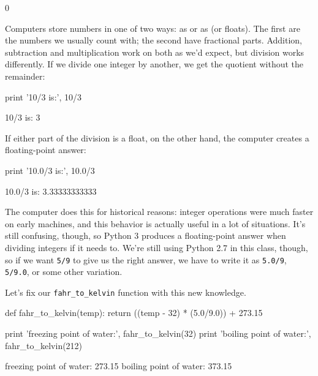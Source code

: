 \documentclass{book}
\begin{document}
\begin{VerbOut}
0
\end{VerbOut}

Computers store numbers in one of two ways: as
 or as  (or floats). The first are the numbers we usually count with;
the second have fractional parts. Addition, subtraction and
multiplication work on both as we'd expect, but division works
differently. If we divide one integer by another, we get the quotient
without the remainder:

\begin{VerbIn}
print '10/3 is:', 10/3
\end{VerbIn}

\begin{VerbOut}
10/3 is: 3
\end{VerbOut}

If either part of the division is a float, on the other hand, the
computer creates a floating-point answer:

\begin{VerbIn}
print '10.0/3 is:', 10.0/3
\end{VerbIn}

\begin{VerbOut}
10.0/3 is: 3.33333333333
\end{VerbOut}

The computer does this for historical reasons: integer operations were
much faster on early machines, and this behavior is actually useful in a
lot of situations. It's still confusing, though, so Python 3 produces a
floating-point answer when dividing integers if it needs to. We're still
using Python 2.7 in this class, though, so if we want \texttt{5/9} to
give us the right answer, we have to write it as \texttt{5.0/9},
\texttt{5/9.0}, or some other variation.

Let's fix our \texttt{fahr\_to\_kelvin} function with this new
knowledge.

\begin{VerbIn}
def fahr_to_kelvin(temp):
    return ((temp - 32) * (5.0/9.0)) + 273.15

print 'freezing point of water:', fahr_to_kelvin(32)
print 'boiling point of water:', fahr_to_kelvin(212)
\end{VerbIn}

\begin{VerbOut}
freezing point of water: 273.15
boiling point of water: 373.15
\end{VerbOut}
\end{document}
